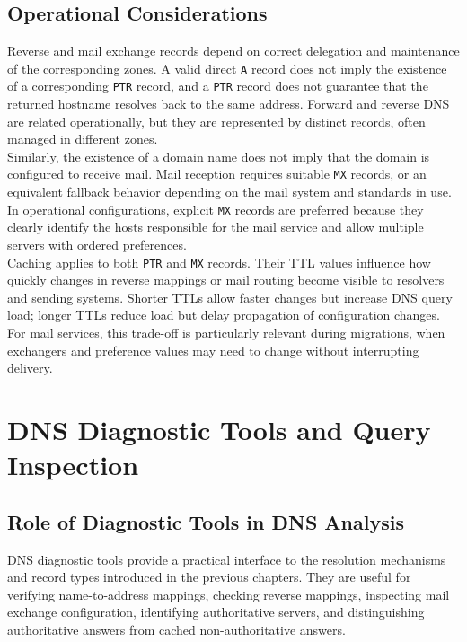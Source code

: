 \documentclass{scrbook}
\begin{document}
	\section{Operational Considerations}
	
	Reverse and mail exchange records depend on correct delegation and maintenance of the corresponding zones. A valid direct \texttt{A} record does not imply the existence of a corresponding \texttt{PTR} record, and a \texttt{PTR} record does not guarantee that the returned hostname resolves back to the same address. Forward and reverse DNS are related operationally, but they are represented by distinct records, often managed in different zones.\\
	
	Similarly, the existence of a domain name does not imply that the domain is configured to receive mail. Mail reception requires suitable \texttt{MX} records, or an equivalent fallback behavior depending on the mail system and standards in use. In operational configurations, explicit \texttt{MX} records are preferred because they clearly identify the hosts responsible for the mail service and allow multiple servers with ordered preferences.\\
	
	Caching applies to both \texttt{PTR} and \texttt{MX} records. Their TTL values influence how quickly changes in reverse mappings or mail routing become visible to resolvers and sending systems. Shorter TTLs allow faster changes but increase DNS query load; longer TTLs reduce load but delay propagation of configuration changes. For mail services, this trade-off is particularly relevant during migrations, when exchangers and preference values may need to change without interrupting delivery.
	
	\chapter{DNS Diagnostic Tools and Query Inspection}
	
	\section{Role of Diagnostic Tools in DNS Analysis}
	
	DNS diagnostic tools provide a practical interface to the resolution mechanisms and record types introduced in the previous chapters. They are useful for verifying name-to-address mappings, checking reverse mappings, inspecting mail exchange configuration, identifying authoritative servers, and distinguishing authoritative answers from cached non-authoritative answers.\\
	
\end{document}
